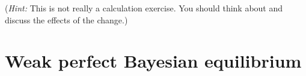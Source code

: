\documentclass[a4paper,12pt]{article}
\begin{document}
\begin{enumerate}
    (\emph{Hint:} This is not really a calculation exercise. You should think about and discuss the effects of the change.)
\end{enumerate}

\section{Weak perfect Bayesian equilibrium}
\label{sec:weak-perf-bayes}
\end{document}
